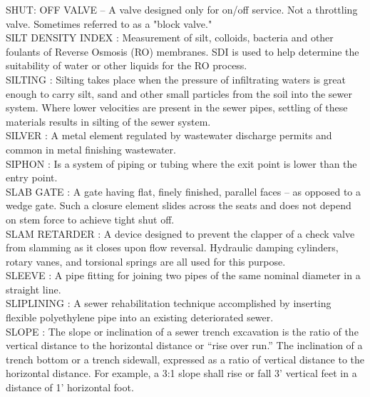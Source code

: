 \vspace{0.15cm}
SHUT: OFF VALVE –  A valve designed only for on/off service. Not a throttling valve. Sometimes referred to as a "block valve."\\
\vspace{0.15cm}
SILT DENSITY INDEX :  Measurement of silt, colloids, bacteria and other foulants of Reverse Osmosis (RO) membranes. SDI is used to help determine the suitability of water or other liquids for the RO process.\\
\vspace{0.15cm}
SILTING :  Silting takes place when the pressure of infiltrating waters is great enough to carry silt, sand and other small particles from the soil into the sewer system. Where lower velocities are present in the sewer pipes, settling of these materials results in silting of the sewer system. \\
\vspace{0.15cm}
SILVER :   A metal element regulated by wastewater discharge permits and common in metal finishing wastewater.\\
\vspace{0.15cm}
SIPHON :   Is a system of piping or tubing where the exit point is lower than the entry point.\\
\vspace{0.15cm}
SLAB GATE :   A gate having flat, finely finished, parallel faces – as opposed to a wedge gate. Such a closure element slides across the seats and does not depend on stem force to achieve tight shut off.\\
\vspace{0.15cm}
SLAM RETARDER :   A device designed to prevent the clapper of a check valve from slamming as it closes upon flow reversal. Hydraulic damping cylinders, rotary vanes, and torsional springs are all used for this purpose.\\
\vspace{0.15cm}
SLEEVE :  A pipe fitting for joining two pipes of the same nominal diameter in a straight line. \\
\vspace{0.15cm}
SLIPLINING :  A sewer rehabilitation technique accomplished by inserting flexible polyethylene pipe into an existing deteriorated sewer. \\
\vspace{0.15cm}
SLOPE :  The slope or inclination of a sewer trench excavation is the ratio of the vertical distance to the horizontal distance or “rise over run.” The inclination of a trench bottom or a trench sidewall, expressed as a ratio of vertical distance to the horizontal distance. For example, a 3:1 slope shall rise or fall 3’ vertical feet in a distance of 1’ horizontal foot. \\
